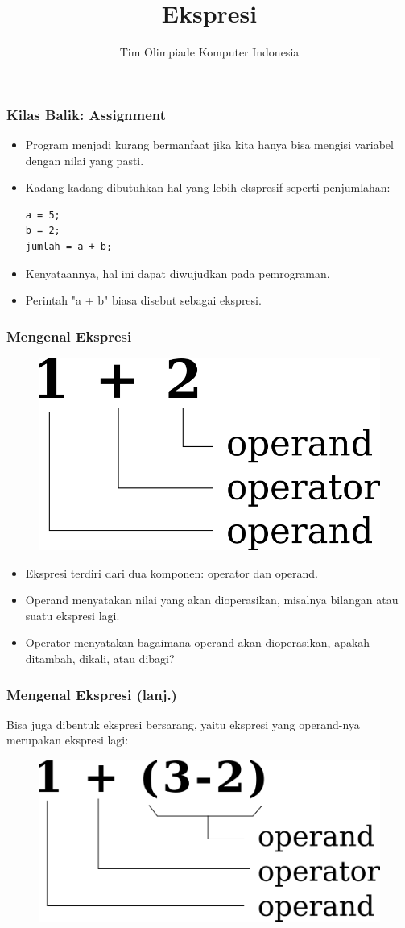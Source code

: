

\title{Ekspresi}
\author{Tim Olimpiade Komputer Indonesia}
\date{}



\begin{frame}
\titlepage
\end{frame}

\begin{frame}[fragile]
\frametitle{Kilas Balik: Assignment}
\begin{itemize}
  \item Program menjadi kurang bermanfaat jika kita hanya bisa mengisi variabel dengan nilai yang pasti. 
  \item Kadang-kadang dibutuhkan hal yang lebih ekspresif seperti penjumlahan:
\begin{lstlisting}
a = 5;
b = 2;
jumlah = a + b;
\end{lstlisting}
  \item Kenyataannya, hal ini dapat diwujudkan pada pemrograman.
  \item Perintah "a + b" biasa disebut sebagai \alert{ekspresi}.
\end{itemize}
\end{frame}

\begin{frame}
\frametitle{Mengenal Ekspresi}
\begin{figure}
  \centering
  \includegraphics[width=4 cm]{asset/ekspresi.png}
\end{figure}
\begin{itemize}
  \item Ekspresi terdiri dari dua komponen: \alert{operator} dan \alert{operand}.
  \item Operand menyatakan nilai yang akan dioperasikan, misalnya bilangan atau suatu ekspresi lagi.
  \item Operator menyatakan bagaimana operand akan dioperasikan, apakah ditambah, dikali, atau dibagi?
\end{itemize}
\end{frame}

\begin{frame}
\frametitle{Mengenal Ekspresi (lanj.)}
Bisa juga dibentuk ekspresi bersarang, yaitu ekspresi yang operand-nya merupakan ekspresi lagi:
\begin{figure}
  \centering
  \includegraphics[width=5 cm]{asset/ekspresi-nested.png}
\end{figure}
\end{frame}

